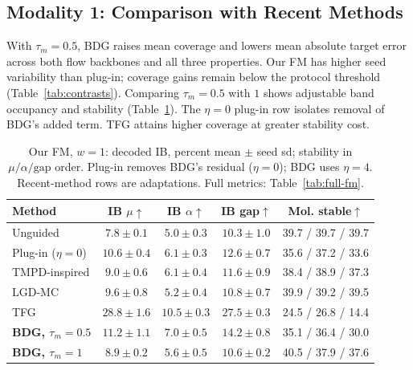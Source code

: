 \documentclass{article}
\begin{document}
\subsection{Modality 1: Comparison with Recent Methods}\label{sec:recent}
With $\tau_m=0.5$, BDG raises mean coverage and lowers mean absolute target error across both flow backbones and all three properties. Our FM has higher seed variability than plug-in; coverage gains remain below the protocol threshold (Table~\ref{tab:contrasts}). Comparing $\tau_m=0.5$ with $1$ shows adjustable band occupancy and stability (Table~\ref{tab:recent}). The $\eta=0$ plug-in row isolates removal of BDG's added term. TFG attains higher coverage at greater stability cost.
\begin{table}[!htbp]
\centering\small
\caption{Our FM, $w=1$: decoded IB, percent mean $\pm$ seed sd; stability in $\mu/\alpha/\mathrm{gap}$ order. Plug-in removes BDG's residual ($\eta=0$); BDG uses $\eta=4$. Recent-method rows are adaptations. Full metrics: Table~\ref{tab:full-fm}.}
\label{tab:recent}
\begin{tabular}{lcccc}
\toprule
Method & IB $\mu\uparrow$ & IB $\alpha\uparrow$ & IB gap$\uparrow$ & Mol. stable$\uparrow$\\
\midrule
Unguided & $7.8\pm0.1$ & $5.0\pm0.3$ & $10.3\pm1.0$ & 39.7 / 39.7 / 39.7\\
Plug-in ($\eta=0$) & $10.6\pm0.4$ & $6.1\pm0.3$ & $12.6\pm0.7$ & 35.6 / 37.2 / 33.6\\
TMPD-inspired & $9.0\pm0.6$ & $6.1\pm0.4$ & $11.6\pm0.9$ & 38.4 / 38.9 / 37.3\\
LGD-MC & $9.6\pm0.8$ & $5.2\pm0.4$ & $10.8\pm0.7$ & 39.9 / 39.2 / 39.5\\
TFG & $28.8\pm1.6$ & $10.5\pm0.3$ & $27.5\pm0.3$ & 24.5 / 26.8 / 14.4\\
\textbf{BDG, $\tau_m=0.5$} & $11.2\pm1.1$ & $7.0\pm0.5$ & $14.2\pm0.8$ & 35.1 / 36.4 / 30.0\\
\textbf{BDG, $\tau_m=1$} & $8.9\pm0.2$ & $5.6\pm0.5$ & $10.6\pm0.2$ & 40.5 / 37.9 / 37.6\\
\bottomrule
\end{tabular}
\end{table}
\end{document}

